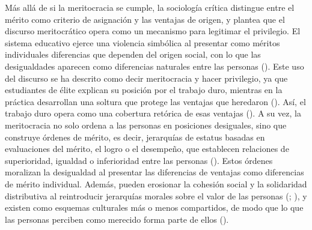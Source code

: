 \documentclass[
  spanish,
  a4paper,
  oneside]{scrbook}
\begin{document}
Más allá de si la meritocracia se cumple, la sociología crítica
distingue entre el mérito como criterio de asignación y las ventajas de
origen, y plantea que el discurso meritocrático opera como un mecanismo
para legitimar el privilegio. El sistema educativo ejerce una violencia
simbólica al presentar como méritos individuales diferencias que
dependen del origen social, con lo que las desigualdades aparecen como
diferencias naturales entre las personas
().
Este uso del discurso se ha descrito como decir meritocracia y hacer
privilegio, ya que estudiantes de élite explican su posición por el
trabajo duro, mientras en la práctica desarrollan una soltura que
protege las ventajas que heredaron (). Así, el trabajo duro opera como una cobertura
retórica de esas ventajas (). A su vez, la meritocracia no solo ordena a las
personas en posiciones desiguales, sino que construye órdenes de mérito,
es decir, jerarquías de estatus basadas en evaluaciones del mérito, el
logro o el desempeño, que establecen relaciones de superioridad,
igualdad o inferioridad entre las personas
().
Estos órdenes moralizan la desigualdad al presentar las diferencias de
ventajas como diferencias de mérito individual. Además, pueden erosionar
la cohesión social y la solidaridad distributiva al reintroducir
jerarquías morales sobre el valor de las personas
(;
), y existen como
esquemas culturales más o menos compartidos, de modo que lo que las
personas perciben como merecido forma parte de ellos
().
\end{document}
